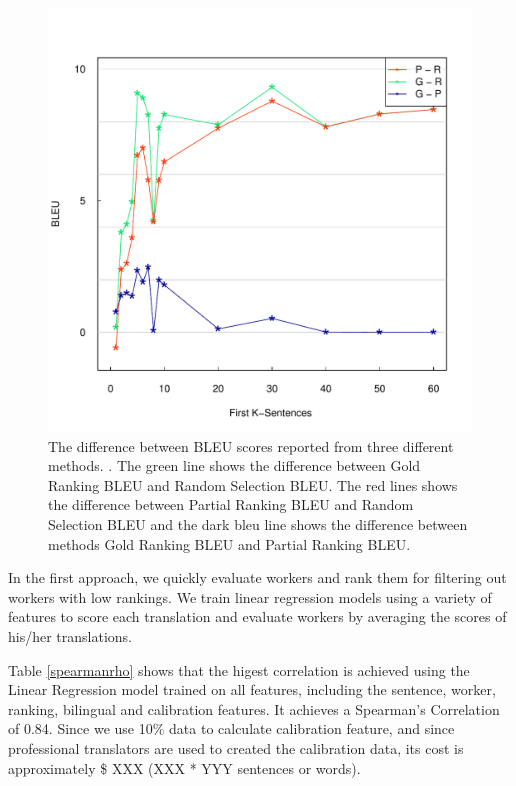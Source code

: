 \documentclass[11pt]{article}
\begin{document}
\begin{figure}[h!]
  \centering
  \includegraphics[width=\linewidth]{senlevelselect/curve2.pdf}
  \caption{ The difference between BLEU scores reported from three different methods. . The green line shows the difference between  Gold Ranking BLEU and Random Selection BLEU.  The red lines shows the difference between Partial Ranking BLEU and Random Selection BLEU and the dark bleu line shows the difference between methods Gold Ranking BLEU and Partial Ranking BLEU.}
    \label{firstksenbleudiff}
\end{figure}

In the first approach, we quickly evaluate workers and rank them for filtering out workers with low rankings. We train linear regression models using a variety of features to score each translation and evaluate workers by averaging the scores of his/her translations. 


Table \ref{spearmanrho} shows that the higest correlation is achieved using the Linear Regression model trained on all features, including the sentence, worker, ranking, bilingual and calibration features.  It achieves a Spearman's Correlation of 0.84.  Since we  use 10\% data to calculate calibration feature, and since professional translators are used to created the calibration data, its cost is approximately \$ XXX (XXX * YYY sentences or words). 
\end{document}
